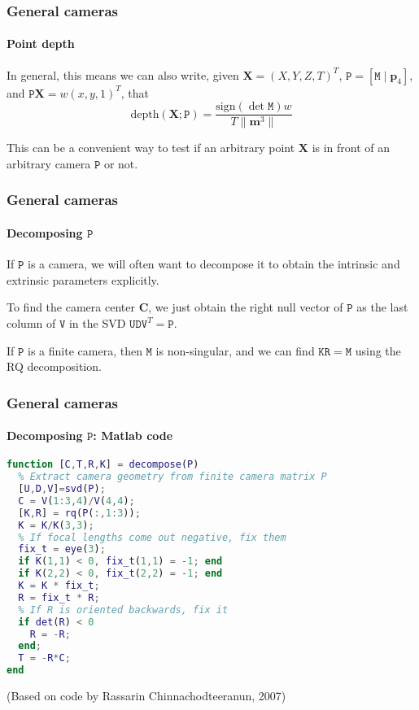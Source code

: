 \documentclass[aspectratio=169]{beamer}
\renewcommand{\vec}[1]{\boldsymbol{#1}}
\newcommand{\mat}[1]{\mathtt{#1}}
\begin{document}
\begin{frame}
\frametitle{General cameras}
\framesubtitle{Point depth}

In general, this means we can also write, given $\vec{X}=(X,Y,Z,T)^T$,
$\mat{P}=[\mat{M}\mid \vec{p}_4]$, and $\mat{P}\vec{X}=w(x,y,1)^T$,
that
\begin{equation*}
\text{depth}(\vec{X};\mat{P}) = \frac{\text{sign}(\det
\mat{M})w}{T\|\vec{m}^3\|}
\end{equation*}

\medskip

This can be a convenient way to test if an arbitrary point $\vec{X}$
is in front of an arbitrary camera $\mat{P}$ or not.

\end{frame}

\begin{frame}
\frametitle{General cameras}
\framesubtitle{Decomposing $\mat{P}$}

If $\mat{P}$ is a camera, we will often want to \alert{decompose} it
to obtain the \alert{intrinsic} and \alert{extrinsic} parameters
explicitly.

\medskip

To find the \alert{camera center} $\vec{C}$, we just obtain the
\alert{right null vector} of $\mat{P}$ as the last column of $\mat{V}$
in the SVD $\mat{U}\mat{D}\mat{V}^T = \mat{P}$.

\medskip

If $\mat{P}$ is a \alert{finite camera}, then $\mat{M}$ is
non-singular, and we can find $\mat{K}\mat{R}=\mat{M}$ using the
\alert{RQ decomposition}.

\end{frame}

\begin{frame}[fragile]
\frametitle{General cameras}
\framesubtitle{Decomposing $\mat{P}$: Matlab code}

{\scriptsize
\begin{lstlisting}[language=matlab]
function [C,T,R,K] = decompose(P)
  % Extract camera geometry from finite camera matrix P
  [U,D,V]=svd(P);
  C = V(1:3,4)/V(4,4);
  [K,R] = rq(P(:,1:3));
  K = K/K(3,3);
  % If focal lengths come out negative, fix them
  fix_t = eye(3);
  if K(1,1) < 0, fix_t(1,1) = -1; end
  if K(2,2) < 0, fix_t(2,2) = -1; end
  K = K * fix_t;
  R = fix_t * R;
  % If R is oriented backwards, fix it
  if det(R) < 0
    R = -R;
  end;
  T = -R*C;
end
\end{lstlisting}

(Based on code by Rassarin Chinnachodteeranun, 2007)}

\end{frame}
\end{document}
